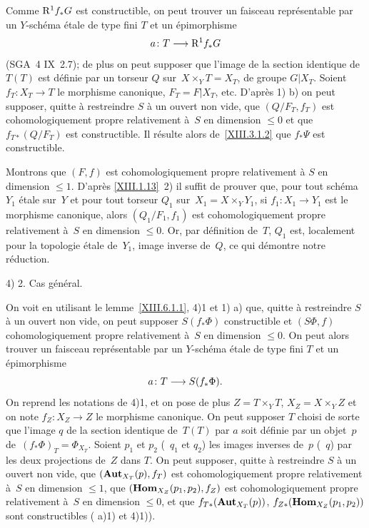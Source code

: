 Comme $\mathrm{R}^1f_*G$ est constructible, on peut trouver un faisceau
repr\'esentable par un $Y$-sch\'ema \'etale de type fini $T$ et
un \'epimorphisme
$$
a \colon T \to \R^1f_*G
$$
(SGA~4 IX~2.7); de plus on peut supposer que l'image de la section
identique de~$T(T)$ est d\'efinie par un torseur $Q$ sur~$X\times_Y
T=X_T$, de groupe $G|X_T$. Soient $f_T \colon X_T \to T$ le morphisme
canonique, $F_T=F|X_T$, etc. D'apr\`es 1) b) on peut supposer,
quitte \`a restreindre $S$ \`a un ouvert non vide, que
$(Q/F_T,f_T)$ est cohomologiquement propre relativement \`a~$S$ en
dimension $\le 0$ et que $f_{T*}(Q/F_T)$ est constructible. Il
r\'esulte alors de~\ref{XIII.3.1.2} que $f_*\Psi$ est constructible.

Montrons que $(F,f)$ est cohomologiquement propre relativement \`a
$S$ en dimension $\le 1$. D'apr\`es \ref{XIII.1.13}~2) il suffit de
prouver que, pour tout sch\'ema $Y_1$ \'etale sur~$Y$ et pour tout
torseur $Q_1$ sur~$X_1=X\times_Y Y_1$, si $f_1 \colon X_1 \to Y_1$ est
le morphisme canonique, alors $(Q_1/F_1,f_1)$ est cohomologiquement
propre relativement \`a~$S$ en dimension $\le 0$. Or, par
d\'efinition de~$T$, $Q_1$ est, localement pour la topologie
\'etale de~$Y_1$, image inverse de~$Q$, ce qui d\'emontre notre
r\'eduction.

4) 2. Cas g\'en\'eral.\par\nopagebreak
On voit en utilisant le lemme~\ref{XIII.6.1.1}, 4)1 et 1) a) que,
quitte \`a restreindre $S$ \`a un ouvert non vide, on peut
supposer $S(f_*\Phi)$ constructible et $(S\Phi,f)$ cohomologiquement
propre relativement \`a~$S$ en dimension $\le 0$. On peut alors
trouver un faisceau repr\'esentable par un $Y$-sch\'ema \'etale
de type fini $T$ et un \'epimorphisme
$$
a \colon T \to S(f_*\Phi)\quoi.
$$
On reprend les notations de 4)1, et on pose de plus $Z=T\times_Y T$,
$X_Z=X\times_Y Z$ et on note $f_Z \colon X_Z \to Z$ le morphisme
canonique. On peut supposer $T$ choisi de sorte que l'image $q$ de la
section identique de~$T(T)$ par $a$ soit d\'efinie par un objet~$p$
de~$(f_*\Phi)_T=\Phi_{X_T}$. Soient $p_1$ et $p_2$ (\resp~$q_1$ et
$q_2$) les images inverses de~$p$ (\resp~$q$) par les deux projections
de~$Z$ dans $T$. On peut supposer, quitte \`a restreindre $S$ \`a
un ouvert non vide, que $(\operatorname{\mathbf{Aut}}_{X_T}(p),f_T)$ est
cohomologiquement propre relativement \`a~$S$ en dimension $\le 1$,
que $(\operatorname{\mathbf{Hom}}_{X_Z}(p_1,p_2),f_Z)$ est cohomologiquement propre
relativement \`a~$S$ en dimension $\le 0$, et que
$f_{T*}(\operatorname{\mathbf{Aut}}_{X_T}(p))$, $f_{Z*}(\operatorname{\mathbf{Hom}}_{X_Z}(p_1,p_2))$ sont
constructibles ( a)1) et 4)1)).

